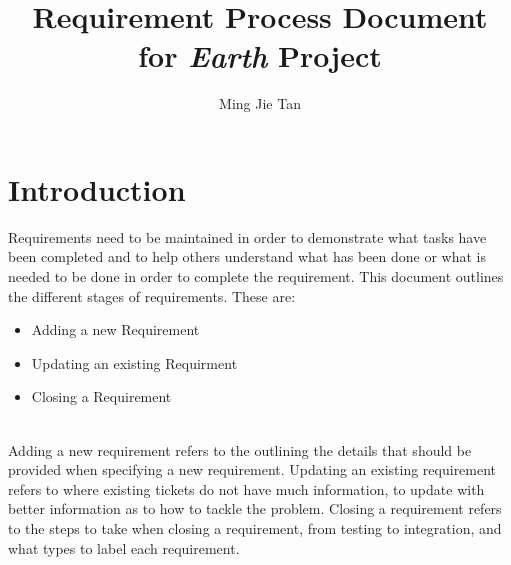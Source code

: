 \documentclass{article}
\begin{document}
\title{\textbf{Requirement Process Document}\\ for \textit{Earth} Project}\author{Ming Jie Tan}

\maketitle
\thispagestyle{empty}
\newpage{}

\thispagestyle{empty}
\tableofcontents
\newpage{}

\setcounter{page}{1}

\section{Introduction}
Requirements need to be maintained in order to demonstrate what tasks have been completed and to help others understand what has been done or what is needed to be done in order to complete the requirement. This document outlines the different stages of requirements. These are:
\begin{itemize}
\item Adding a new Requirement
\item Updating an existing Requirment
\item Closing a Requirement
\end{itemize}
\\
Adding a new requirement refers to the outlining the details that should be provided when specifying a new requirement.
Updating an existing requirement refers to where existing tickets do not have much information, to update with better information as to how to tackle the problem.
Closing a requirement refers to the steps to take when closing a requirement, from testing to integration, and what types to label each requirement.

\newpage{}
\end{document}
